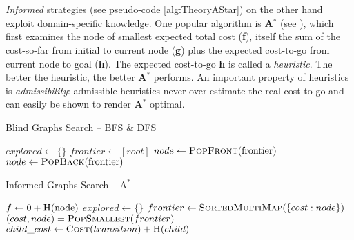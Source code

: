 \\
\\
\noindent \textit{Informed} strategies (see pseudo-code \ref{alg:TheoryAStar}) on the other hand exploit domain-specific knowledge. One popular algorithm is \textbf{A$^{*}$} (see \cite{DBLP:journals/jacm/DechterP85}), which first examines the node of smallest expected total cost (\textbf{f}), itself the sum of the cost-so-far from initial to current node (\textbf{g}) plus the expected cost-to-go from current node to goal (\textbf{h}). The expected cost-to-go \textbf{h} is called a \textit{heuristic}. The better the heuristic, the better \textbf{A$^{*}$} performs. An important property of heuristics is \textit{admissibility}: admissible heuristics never over-estimate the real cost-to-go and can easily be shown to render \textbf{A$^{*}$} optimal.
\teal
\begin{algorithm}[H]
\caption{Blind Graphs Search -- BFS \& DFS}\label{alg:TheoryBFSDFS}
\begin{algorithmic}
\EndIf
\State $explored \gets \{\}$
\State $frontier \gets [root]$
\State{}
 \EndIf
 \State $node \gets \Call{PopFront}{$frontier$}$
 \Else
 \State $node \gets \Call{PopBack}{$frontier$}$ \teal {} \black
 \EndIf
\State {}
\EndIf
\State {}
\EndFor
\EndWhile
\EndFunction
\end{algorithmic}
\end{algorithm}
\black
\teal
\begin{algorithm}[H]
\caption{Informed Graphs Search -- A$^{*}$}\label{alg:TheoryAStar}
\begin{algorithmic}
 \teal {} \black
\State{}
\State $f \gets 0 + \Call{H}{$node$}$
\State $explored \gets \{\}$
\State $frontier \gets \Call{SortedMultiMap}{\{cost: node\}}$
\State{}
 \EndIf
\State $(cost, node) = \Call{PopSmallest}{frontier}$
\EndIf
\State {}
	\State $child\_cost \gets \Call{Cost}{transition} + \Call{H}{child}$
             \\
             \ \ \ \ \ \ \ \ \ \ \ \ \ \ \ \ \ \ \ \ \ \ \ \ 
	\EndIf
\EndFor
\EndWhile
\EndFunction
\end{algorithmic}
\end{algorithm}
\black

